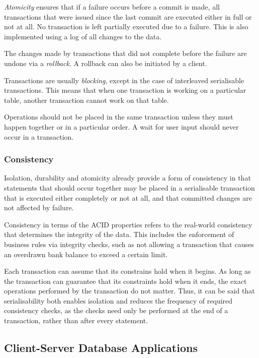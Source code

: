 \emph{Atomicity} ensures that if a failure occurs before a commit is made, all transactions that were issued since the last commit are executed either in full or not at all.
No transaction is left partially executed due to a failure.
This is also implemented using  a log of all changes to the data.

The changes made by transactions that did not complete before the failure are undone via a \emph{rollback}.
A rollback can also be initiated by a client.

Transactions are usually \emph{blocking}, except in the case of interleaved serialisable transactions.
This means that when one transaction is working on a particular table, another transaction cannot work on that table.

Operations should not be placed in the same transaction unless they must happen together or in a particular order.
A wait for user input should never occur in a transaction.

\subsubsection{Consistency}

Isolation, durability and atomicity already provide a form of consistency in that statements that should occur together may be placed in a serialisable transaction that is executed either completely or not at all, and that committed changes are not affected by failure.

Consistency in terms of the ACID properties refers to the real-world consistency that determines the integrity of the data.
This includes the enforcement of business rules via integrity checks, such as not allowing a transaction that causes an overdrawn bank balance to exceed a certain limit.

Each transaction can assume that its constrains hold when it begins.
As long as the transaction can guarantee that its constraints hold when it ends, the exact operations performed by the transaction do not matter.
Thus, it can be said that serialisability both enables isolation and reduces the frequency of required consistency checks, as the checks need only be performed at the end of a transaction, rather than after every statement.

\subsection{Client-Server Database Applications}

